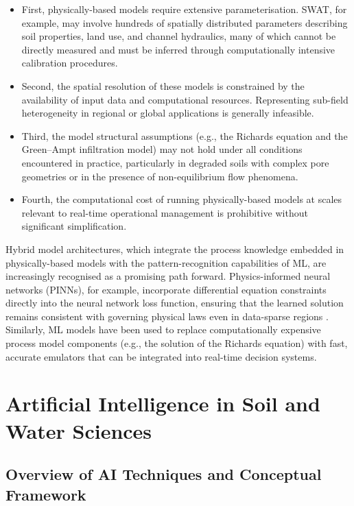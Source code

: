 \documentclass[land,article,submit,pdftex,moreauthors]{Definitions/mdpi}
\numberwithin{equation}{section}
\begin{document}
\begin{itemize}
    \item First, physically-based models require extensive parameterisation. SWAT, for example, may involve hundreds of spatially distributed parameters describing soil properties, land use, and channel hydraulics, many of which cannot be directly measured and must be inferred through computationally intensive calibration procedures.
    \item Second, the spatial resolution of these models is constrained by the availability of input data and computational resources. Representing sub-field heterogeneity in regional or global applications is generally infeasible.    
    \item Third, the model structural assumptions (e.g., the Richards equation and the Green--Ampt infiltration model) may not hold under all conditions encountered in practice, particularly in degraded soils with complex pore geometries or in the presence of non-equilibrium flow phenomena.    
    \item Fourth, the computational cost of running physically-based models at scales relevant to real-time operational management is prohibitive without significant simplification.
\end{itemize}

Hybrid model architectures, which integrate the process knowledge embedded in physically-based models with the pattern-recognition capabilities of ML, are increasingly recognised as a promising path forward. Physics-informed neural networks (PINNs), for example, incorporate differential equation constraints directly into the neural network loss function, ensuring that the learned solution remains consistent with governing physical laws even in data-sparse regions \citep{raissi2019physics}. Similarly, ML models have been used to replace computationally expensive process model components (e.g., the solution of the Richards equation) with fast, accurate emulators that can be integrated into real-time decision systems.


\section{Artificial Intelligence in Soil and Water Sciences}

\subsection{Overview of AI Techniques and Conceptual Framework}
\end{document}

